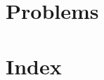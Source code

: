 \documentclass[11pt,notitlepage]{scrreprt}
\subtitle{Problem proposals packet}
\begin{document}


\chapter{Problems}


\chapter*{Index}

\end{document}
